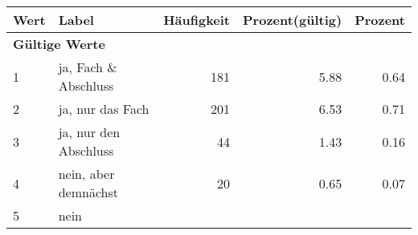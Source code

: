      \begin{longtable}{lXrrr}
     \toprule
     \textbf{Wert} & \textbf{Label} & \textbf{Häufigkeit} & \textbf{Prozent(gültig)} & \textbf{Prozent} \\
     \endhead
     \midrule
     \multicolumn{5}{l}{\textbf{Gültige Werte}}\\

     1 &
     \multicolumn{1}{X}{ ja, Fach \& Abschluss   } &


       \num{181} &
       \num[round-mode=places,round-precision=2]{5.88} &
         \num[round-mode=places,round-precision=2]{0.64} \\

     2 &
     \multicolumn{1}{X}{ ja, nur das Fach   } &


       \num{201} &
       \num[round-mode=places,round-precision=2]{6.53} &
         \num[round-mode=places,round-precision=2]{0.71} \\

     3 &
     \multicolumn{1}{X}{ ja, nur den Abschluss   } &


       \num{44} &
       \num[round-mode=places,round-precision=2]{1.43} &
         \num[round-mode=places,round-precision=2]{0.16} \\

     4 &
     \multicolumn{1}{X}{ nein, aber demnächst   } &


       \num{20} &
       \num[round-mode=places,round-precision=2]{0.65} &
         \num[round-mode=places,round-precision=2]{0.07} \\

     5 &
     \multicolumn{1}{X}{ nein   } &



\end{longtable}
